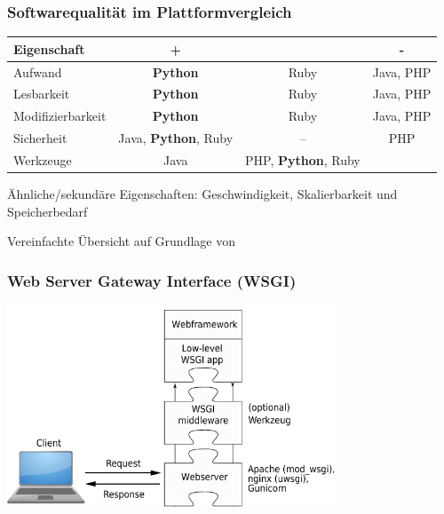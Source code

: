 \documentclass[
    t,
    smaller,
    compress,
    xcolor=svgnames,            %
    table,
]{beamer}
\begin{document}
\begin{frame}[fragile]
  \frametitle{Softwarequalität im Plattformvergleich}

  \begin{table}[h]
    \begin{tabular}{|l||c|c|c|}
     \hline
      Eigenschaft          & \cellcolor{dkgreen} + & \cellcolor{yellow} & \cellcolor{red} - \\ \hline \hline

      Aufwand   & \textbf{Python} & Ruby & Java, PHP  \\ \hline
      Lesbarkeit           & \textbf{Python} & Ruby & Java, PHP \\ \hline
      Modifizierbarkeit    & \textbf{Python} & Ruby & Java, PHP \\ \hline
      Sicherheit           & Java, \textbf{Python}, Ruby & -- & PHP \\ \hline
      Werkzeuge & Java & PHP, \textbf{Python}, Ruby &  \\ \hline
    \end{tabular}
  \end{table}

  Ähnliche/sekundäre Eigenschaften: Geschwindigkeit, Skalierbarkeit und
  Speicherbedarf

  \vspace{12pt}
  Vereinfachte Übersicht auf Grundlage von  \cite{hardy:2007}
\end{frame}


\begin{frame}
  \frametitle{Web Server Gateway Interface (WSGI)}
  \includegraphics[height=60mm]{wsgi.png}
\end{frame}
\end{document}
